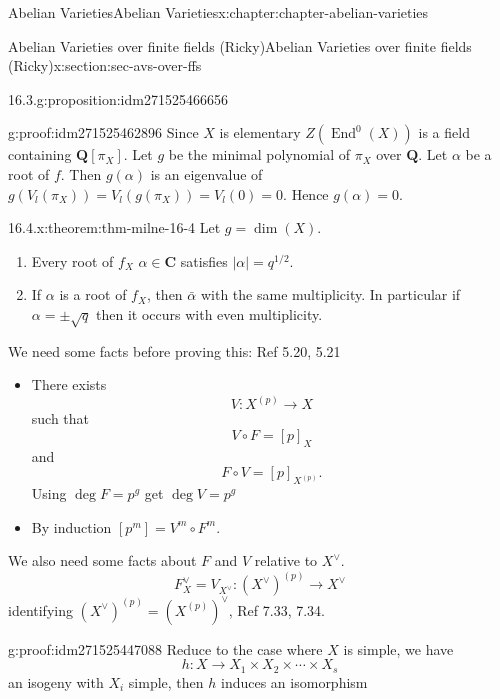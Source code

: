 \documentclass[oneside,10pt,]{book}
\numberwithin{equation}{section}
\newcommand{\lb}{[}
\newcommand{\rb}{]}
\newcommand{\QQ}{\mathbf{Q}}
\newcommand{\CC}{\mathbf{C}}
\DeclareMathOperator{\End}{End}
\begin{document}
\begin{chapterptx}{Abelian Varieties}{}{Abelian Varieties}{}{}{x:chapter:chapter-abelian-varieties}
\begin{sectionptx}{Abelian Varieties over finite fields (Ricky)}{}{Abelian Varieties over finite fields (Ricky)}{}{}{x:section:sec-avs-over-ffs}
\begin{proposition}{16.3.}{}{g:proposition:idm271525466656}
\end{proposition}
\begin{proofptx}{}{g:proof:idm271525462896}
Since \(X\) is elementary \(Z(\End^0(X))\) is  a field containing \(\QQ\lb \pi_X\rb\). Let \(g\) be the minimal polynomial of \(\pi_X\) over \(\QQ\). Let \(\alpha\) be a root of \(f\). Then \(g(\alpha)\) is an eigenvalue of \(g(V_l(\pi_X)) = V_l(g(\pi_X)) = V_l(0) = 0\). Hence \(g(\alpha) = 0\).%
\end{proofptx}
\begin{theorem}{16.4.}{}{x:theorem:thm-milne-16-4}%
Let \(g= \dim (X)\).%
\begin{enumerate}
\item{}Every root of \(f_X\) \(\alpha \in \CC\) satisfies \(|\alpha| = q^{1/2}\).%
\item{}If \(\alpha\) is  a root of \(f_X\), then \(\bar \alpha\) with the same multiplicity. In particular if \(\alpha = \pm \sqrt q\) then it occurs with even multiplicity.%
\end{enumerate}
%
\end{theorem}
We need some facts before proving this: Ref 5.20, 5.21%
\begin{itemize}[label=\textbullet]
\item{}There exists%
\begin{equation*}
V\colon X^{(p)} \to X
\end{equation*}
such that%
\begin{equation*}
V\circ F = [p]_X
\end{equation*}
and%
\begin{equation*}
F \circ V = [p]_{X^{(p)}}\text{.}
\end{equation*}
Using \(\deg F = p^g \)  get \(\deg V = p^g\)%
\item{}By induction \(\lb p^m\rb = V^m \circ F^m\).%
\end{itemize}
%
\par
We also need some facts about \(F\) and \(V\) relative to \(X^\vee\).%
\begin{equation*}
F_X^\vee = V_{X^\vee} \colon (X^\vee)^{(p)} \to X^\vee
\end{equation*}
identifying \((X^\vee)^{(p)} = (X^{(p)})^\vee\), Ref 7.33, 7.34.%
\begin{proofptx}{}{g:proof:idm271525447088}
Reduce to the case where \(X\) is simple, we have%
\begin{equation*}
h\colon X\to X_1 \times X_2 \times \cdots \times X_s
\end{equation*}
an isogeny with \(X_i\) simple, then \(h\) induces an isomorphism%

\end{proofptx}
\end{sectionptx}
\end{chapterptx}
\end{document}
